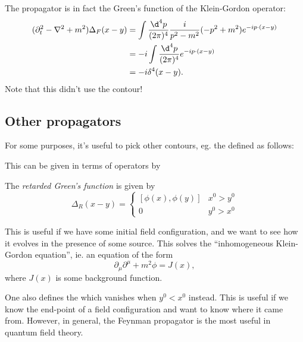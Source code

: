 \documentclass[a4paper]{article}
\begin{document}
The propagator is in fact the Green's function of the Klein-Gordon operator:
\begin{align*}
  (\partial_t^2 - \nabla^2 + m^2) \Delta_F(x - y) &= \int \frac{\d^4 p}{(2\pi)^4} \frac{i}{p^2 - m^2}(-p^2 + m^2) e^{-ip\cdot(x - y)}\\
  &= -i \int \frac{\d^4 p}{(2\pi)^4} e^{-ip\cdot(x - y)}\\
  &= -i \delta^4(x - y).
\end{align*}
Note that this didn't use the contour!

\subsection{Other propagators}
For some purposes, it's useful to pick other contours, eg. the  defined as follows:
\begin{center}
\end{center}
This can be given in terms of operators by
\begin{defi}
  The \emph{retarded Green's function} is given by
  \[
    \Delta_R(x - y) =
    \begin{cases}
      [\phi(x), \phi(y)]& x^0 > y^0\\
      0 & y^0 > x^0
    \end{cases}
  \]
\end{defi}
This is useful if we have some initial field configuration, and we want to see how it evolves in the presence of some source. This solves the ``inhomogeneous Klein-Gordon equation'', ie. an equation of the form
\[
  \partial_\mu \partial^\mu + m^2 \phi = J(x),
\]
where $J(x)$ is some background function.

One also defines the  which vanishes when $y^0 < x^0$ instead. This is useful if we know the end-point of a field configuration and want to know where it came from. However, in general, the Feynman propagator is the most useful in quantum field theory.
\end{document}
